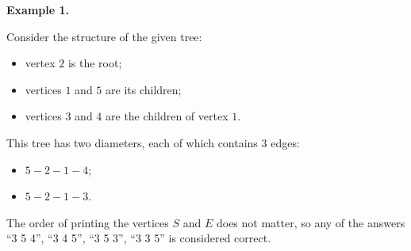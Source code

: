 \textbf{Example 1.}

Consider the structure of the given tree:

\begin{itemize}

\item vertex $2$ is the root;

\item vertices $1$ and $5$ are its children;

\item vertices $3$ and $4$ are the children of vertex $1$.

\end{itemize}

This tree has two diameters, each of which contains $3$ edges:

\begin{itemize}

\item $5 - 2 - 1 - 4$;

\item $5 - 2 - 1 - 3$.

\end{itemize}

The order of printing the vertices $S$ and $E$ does not matter, so any of the answers ``3 5 4'', ``3 4 5'', ``3 5 3'', ``3 3 5'' is considered correct.
